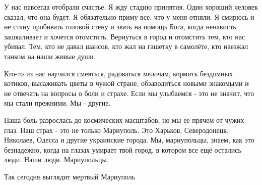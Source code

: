 У нас навсегда отобрали счастье. Я жду стадию принятия. Один хороший человек
сказал, что она будет. Я обязательно приму все, что у меня отняли. Я смирюсь и
не стану пробивать головой стену и звать на помощь Бога, когда ненависть
зашкаливает и хочется отомстить. Вернуться в город  и отомстить тем, кто нас
убивал. Тем, кто не давал шансов, кто жал на гашетку в самолёте, кто наезжал
танком на наши  живые души. 

Кто-то из нас  научился смеяться, радоваться мелочам, кормить бездомных
котиков, высаживать цветы в чужой стране, обзаводиться новыми  знакомыми и не
отвечать на вопросы о боли и страхе. Если мы улыбаемся - это не значит, что мы
стали прежними. Мы - другие.

Наша боль разрослась до космических масштабов, но мы ее прячем от чужих глаз.
Наш страх - это не только Мариуполь. Это Харьков, Северодонецк, Николаев,
Одесса и другие украинские города. Мы, мариупольцы, знаем, как это безнадежно,
когда на  глазах умирает твой город, в котором все ещё остались люди. Наши
люди. Мариупольцы. 

Так сегодня выглядит мертвый Мариуполь

